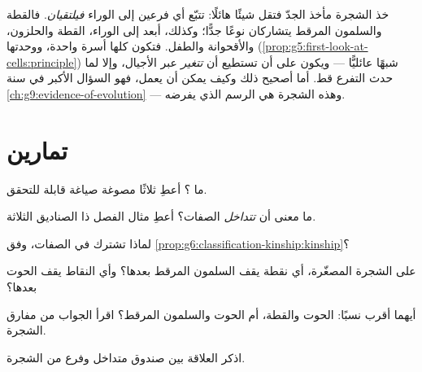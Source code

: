\begin{remark}\label{rem:g6:classification-kinship:implies}
خذ الشجرة مأخذ الجدّ فتقل شيئًا هائلًا: تتبّع أي فرعين إلى الوراء
\emph{فيلتقيان}. فالقطة والسلمون المرقط يتشاركان نوعًا جدًّا؛ وكذلك،
أبعد إلى الوراء، القطة والحلزون، والأقحوانة والطفل. فتكون
 كلها أسرة واحدة، ووحدتها
(\cref{prop:g5:first-look-at-cells:principle}) شبهًا عائليًّا ---
ويكون على  أن تستطيع أن \emph{تتغير} عبر الأجيال، وإلا لما
حدث التفرع قط. أما أصحيح ذلك وكيف يمكن أن يعمل، فهو السؤال الأكبر
في سنة \cref{ch:g9:evidence-of-evolution} --- وهذه الشجرة هي الرسم
الذي يفرضه.
\end{remark}

\section{تمارين}

\begin{exercise}[$\star$]\label{exo:g6:classification-kinship:1}
ما ؟ أعطِ ثلاثًا مصوغة صياغة قابلة للتحقق.
\end{exercise}

\begin{exercise}[$\star$]\label{exo:g6:classification-kinship:2}
ما معنى أن \emph{تتداخل} الصفات؟ أعطِ مثال الفصل ذا الصناديق
الثلاثة.
\end{exercise}

\begin{exercise}[$\star$]\label{exo:g6:classification-kinship:3}
لماذا تشترك  في الصفات، وفق
\cref{prop:g6:classification-kinship:kinship}؟
\end{exercise}

\begin{exercise}[$\star$]\label{exo:g6:classification-kinship:4}
على الشجرة المصغّرة، أي نقطة  يقف السلمون المرقط بعدها؟ وأي
النقاط يقف الحوت بعدها؟
\end{exercise}

\begin{exercise}[$\star$]\label{exo:g6:classification-kinship:5}
أيهما أقرب نسبًا: الحوت والقطة، أم الحوت والسلمون المرقط؟ اقرأ
الجواب من مفارق الشجرة.
\end{exercise}

\begin{exercise}[$\star$]\label{exo:g6:classification-kinship:6}
اذكر العلاقة بين صندوق متداخل وفرع من الشجرة.
\end{exercise}

